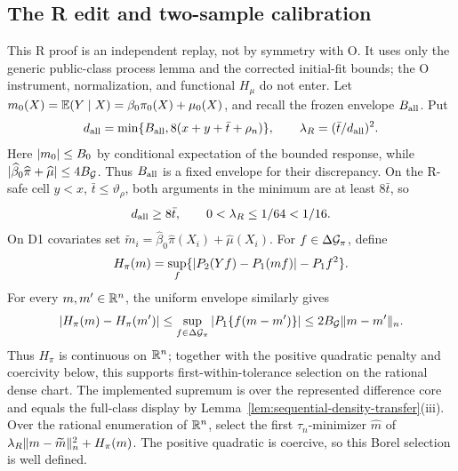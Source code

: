 \subsection{The R edit and two-sample calibration}
\label{app:upper-r-calibration}

This R proof is an independent replay, not by symmetry with O.  It uses only
the generic public-class process lemma and the corrected initial-fit bounds;
the O instrument, normalization, and functional \(H_\mu\) do not enter.
Let \(m_0(X)=\mathbb E(Y\mid X)=\beta_0\pi_0(X)+\mu_0(X)\),
and recall the frozen envelope \(B_{\rm all}\).  Put
\[
 d_{\rm all}=\min\{B_{\rm all},8(x+y+\bar t+\rho_n)\},\qquad
 \lambda_R=(\bar t/d_{\rm all})^2.
\]
Here \(\lvert m_0\rvert\le B_0\) by conditional expectation of the bounded
response, while
\(\lvert \widehat\beta_0\widehat\pi+\widehat\mu\rvert\le4B_{\mathcal G}\).
Thus \(B_{\rm all}\) is a fixed envelope for their discrepancy.
On the R-safe cell \(y<x\), \(\bar t\le\vartheta_\rho\), both arguments in
the minimum are at least \(8\bar t\), so
\[
 d_{\rm all}\ge8\bar t,\qquad0<\lambda_R\le1/64<1/16.
\]
On D1 covariates set
\(\widetilde m_i=\widehat\beta_0\widehat\pi(X_i)+\widehat\mu(X_i)\).
For \(f\in\Delta\mathcal G_\pi\), define
\[
 H_\pi(m)=\sup_f\{\lvert P_2(Yf)-P_1(mf)\rvert-P_1f^2\}.
\]
For every \(m,m'\in\mathbb R^n\), the uniform envelope similarly gives
\[
 |H_\pi(m)-H_\pi(m')|
 \le\sup_{f\in\Delta\mathcal G_\pi}|P_1\{f(m-m')\}|
 \le2B_{\mathcal G}\lVert m-m'\rVert_n.
\]
Thus \(H_\pi\) is continuous on \(\mathbb R^n\); together with the positive
quadratic penalty and coercivity below, this supports first-within-tolerance
selection on the rational dense chart.
The implemented supremum is over the represented difference core and equals
the full-class display by Lemma~\ref{lem:sequential-density-transfer}(iii).
Over the rational enumeration of \(\mathbb R^n\), select the first
\(\tau_n\)-minimizer \(\widehat m\) of
\(\lambda_R\lVert m-\widetilde m\rVert_n^2+H_\pi(m)\).  The positive quadratic is
coercive, so this Borel selection is well defined.

